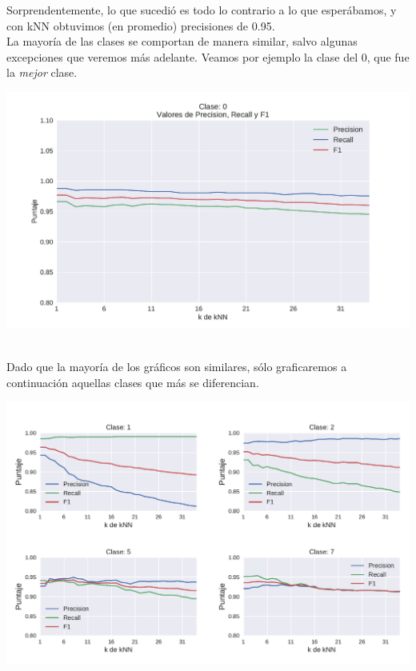 Sorprendentemente, lo que sucedió es todo lo contrario a lo que esperábamos, y con kNN obtuvimos (en promedio) precisiones de 0.95. \\

La mayoría de las clases se comportan de manera similar, salvo algunas excepciones que veremos más adelante. Veamos por ejemplo la clase del 0, que fue la \textit{mejor} clase.

{\centering
    \includegraphics[scale=0.55]{informe/imagenes/knn/precisionClase0.pdf} \\
}
$ $\newline

Dado que la mayoría de los gráficos son similares, sólo graficaremos a continuación aquellas clases que más se diferencian.

{\centering
    \includegraphics[scale=0.70]{informe/imagenes/knn/precisionClase1257.pdf} \\
    \label{fig:knnclasesvariacion}
}
$ $\newline

